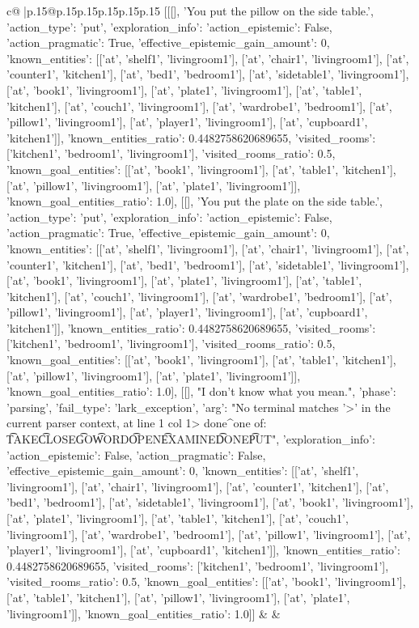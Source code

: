\documentclass{article}
\begin{document}
{\begin{supertabular}{c@{$\;$}|p{.15\linewidth}@{}p{.15\linewidth}p{.15\linewidth}p{.15\linewidth}p{.15\linewidth}p{.15\linewidth}}
{{{	 [[[], 'You put the pillow on the side table.', {'action_type': 'put', 'exploration_info': {'action_epistemic': False, 'action_pragmatic': True, 'effective_epistemic_gain_amount': 0, 'known_entities': [['at', 'shelf1', 'livingroom1'], ['at', 'chair1', 'livingroom1'], ['at', 'counter1', 'kitchen1'], ['at', 'bed1', 'bedroom1'], ['at', 'sidetable1', 'livingroom1'], ['at', 'book1', 'livingroom1'], ['at', 'plate1', 'livingroom1'], ['at', 'table1', 'kitchen1'], ['at', 'couch1', 'livingroom1'], ['at', 'wardrobe1', 'bedroom1'], ['at', 'pillow1', 'livingroom1'], ['at', 'player1', 'livingroom1'], ['at', 'cupboard1', 'kitchen1']], 'known_entities_ratio': 0.4482758620689655, 'visited_rooms': ['kitchen1', 'bedroom1', 'livingroom1'], 'visited_rooms_ratio': 0.5, 'known_goal_entities': [['at', 'book1', 'livingroom1'], ['at', 'table1', 'kitchen1'], ['at', 'pillow1', 'livingroom1'], ['at', 'plate1', 'livingroom1']], 'known_goal_entities_ratio': 1.0}}], [[], 'You put the plate on the side table.', {'action_type': 'put', 'exploration_info': {'action_epistemic': False, 'action_pragmatic': True, 'effective_epistemic_gain_amount': 0, 'known_entities': [['at', 'shelf1', 'livingroom1'], ['at', 'chair1', 'livingroom1'], ['at', 'counter1', 'kitchen1'], ['at', 'bed1', 'bedroom1'], ['at', 'sidetable1', 'livingroom1'], ['at', 'book1', 'livingroom1'], ['at', 'plate1', 'livingroom1'], ['at', 'table1', 'kitchen1'], ['at', 'couch1', 'livingroom1'], ['at', 'wardrobe1', 'bedroom1'], ['at', 'pillow1', 'livingroom1'], ['at', 'player1', 'livingroom1'], ['at', 'cupboard1', 'kitchen1']], 'known_entities_ratio': 0.4482758620689655, 'visited_rooms': ['kitchen1', 'bedroom1', 'livingroom1'], 'visited_rooms_ratio': 0.5, 'known_goal_entities': [['at', 'book1', 'livingroom1'], ['at', 'table1', 'kitchen1'], ['at', 'pillow1', 'livingroom1'], ['at', 'plate1', 'livingroom1']], 'known_goal_entities_ratio': 1.0}}], [[], "I don't know what you mean.", {'phase': 'parsing', 'fail_type': 'lark_exception', 'arg': "No terminal matches '>' in the current parser context, at line 1 col 1\n\n> done\n^\nExpected one of: \n\t* TAKE\n\t* CLOSE\n\t* GO\n\t* WORD\n\t* OPEN\n\t* EXAMINE\n\t* DONE\n\t* PUT\n", 'exploration_info': {'action_epistemic': False, 'action_pragmatic': False, 'effective_epistemic_gain_amount': 0, 'known_entities': [['at', 'shelf1', 'livingroom1'], ['at', 'chair1', 'livingroom1'], ['at', 'counter1', 'kitchen1'], ['at', 'bed1', 'bedroom1'], ['at', 'sidetable1', 'livingroom1'], ['at', 'book1', 'livingroom1'], ['at', 'plate1', 'livingroom1'], ['at', 'table1', 'kitchen1'], ['at', 'couch1', 'livingroom1'], ['at', 'wardrobe1', 'bedroom1'], ['at', 'pillow1', 'livingroom1'], ['at', 'player1', 'livingroom1'], ['at', 'cupboard1', 'kitchen1']], 'known_entities_ratio': 0.4482758620689655, 'visited_rooms': ['kitchen1', 'bedroom1', 'livingroom1'], 'visited_rooms_ratio': 0.5, 'known_goal_entities': [['at', 'book1', 'livingroom1'], ['at', 'table1', 'kitchen1'], ['at', 'pillow1', 'livingroom1'], ['at', 'plate1', 'livingroom1']], 'known_goal_entities_ratio': 1.0}}]] 
	  } 
	   } 
	   } 
	 & & \\ 
 


\end{supertabular}}
\end{document}
